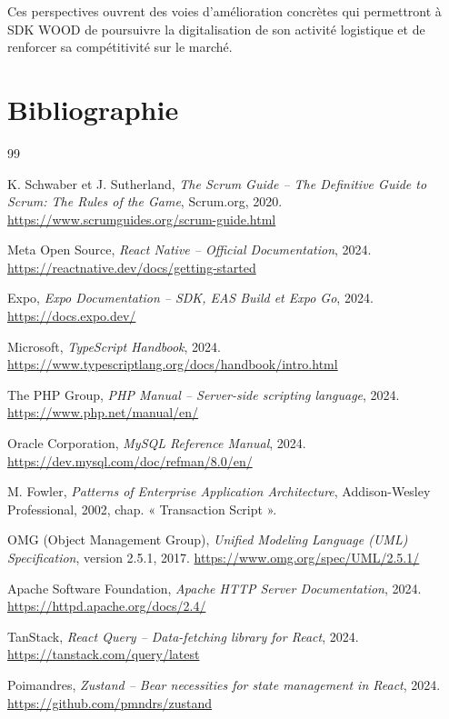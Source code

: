 \documentclass[12pt,a4paper]{article}
\begin{document}
    Ces perspectives ouvrent des voies d'amélioration concrètes qui permettront à SDK WOOD de poursuivre la digitalisation de son activité logistique et de renforcer sa compétitivité sur le marché.

    \newpage
    \section*{Bibliographie}

    \begin{thebibliography}{99}

    K. Schwaber et J. Sutherland, \textit{The Scrum Guide -- The Definitive Guide to Scrum: The Rules of the Game}, Scrum.org, 2020. \url{https://www.scrumguides.org/scrum-guide.html}

    Meta Open Source, \textit{React Native -- Official Documentation}, 2024. \url{https://reactnative.dev/docs/getting-started}

    Expo, \textit{Expo Documentation -- SDK, EAS Build et Expo Go}, 2024. \url{https://docs.expo.dev/}

    Microsoft, \textit{TypeScript Handbook}, 2024. \url{https://www.typescriptlang.org/docs/handbook/intro.html}

    The PHP Group, \textit{PHP Manual -- Server-side scripting language}, 2024. \url{https://www.php.net/manual/en/}

    Oracle Corporation, \textit{MySQL Reference Manual}, 2024. \url{https://dev.mysql.com/doc/refman/8.0/en/}

    M. Fowler, \textit{Patterns of Enterprise Application Architecture}, Addison-Wesley Professional, 2002, chap. « Transaction Script ».

    OMG (Object Management Group), \textit{Unified Modeling Language (UML) Specification}, version 2.5.1, 2017. \url{https://www.omg.org/spec/UML/2.5.1/}

    Apache Software Foundation, \textit{Apache HTTP Server Documentation}, 2024. \url{https://httpd.apache.org/docs/2.4/}

    TanStack, \textit{React Query -- Data-fetching library for React}, 2024. \url{https://tanstack.com/query/latest}

    Poimandres, \textit{Zustand -- Bear necessities for state management in React}, 2024. \url{https://github.com/pmndrs/zustand}


\end{thebibliography}
\end{document}
